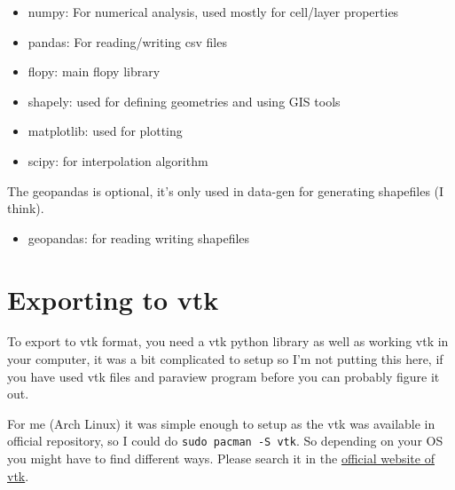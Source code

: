 \documentclass[titlepage,12pt]{unisubmission}
\begin{document}
\begin{itemize}
\item numpy: For numerical analysis, used mostly for cell/layer properties
\item pandas: For reading/writing csv files
\item flopy: main flopy library
\item shapely: used for defining geometries and using GIS tools
\item matplotlib: used for plotting
\item scipy: for interpolation algorithm
\end{itemize}

The geopandas is optional, it's only used in data-gen for generating shapefiles (I think).
\begin{itemize}
\item geopandas: for reading writing shapefiles
\end{itemize}



\section{Exporting to vtk}
\label{sec:org3182fd5}
To export to vtk format, you need a vtk python library as well as working vtk in your computer, it was a bit complicated to setup so I'm not putting this here, if you have used vtk files and paraview program before you can probably figure it out.

For me (Arch Linux) it was simple enough to setup as the vtk was available in official repository, so I could do \texttt{sudo pacman -S vtk}. So depending on your OS you might have to find different ways. Please search it in the \href{https://vtk.org/}{official website of vtk}.
\end{document}
